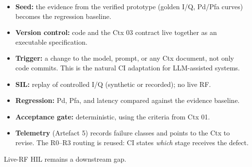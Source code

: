 \documentclass[11pt,a4paper]{article}
\begin{document}
\begin{itemize}[leftmargin=*,itemsep=1pt]
\item \textbf{Seed:} the evidence from the verified prototype (golden I/Q, Pd/Pfa curves)
  becomes the regression baseline.
\item \textbf{Version control:} code and the Ctx 03 contract live together as an
  executable specification.
\item \textbf{Trigger:} a change to the model, prompt, or any Ctx document, not only
  code commits. This is the natural CI adaptation for LLM-assisted systems.
\item \textbf{SIL:} replay of controlled I/Q (synthetic or recorded); no live RF.
\item \textbf{Regression:} Pd, Pfa, and latency compared against the evidence baseline.
\item \textbf{Acceptance gate:} deterministic, using the criteria from Ctx 01.
\item \textbf{Telemetry} (Artefact 5) records failure classes and points to the Ctx to
  revise. The R0--R3 routing is reused: CI states \emph{which} stage receives the defect.
\end{itemize}

Live-RF HIL remains a downstream gap.
\end{document}

